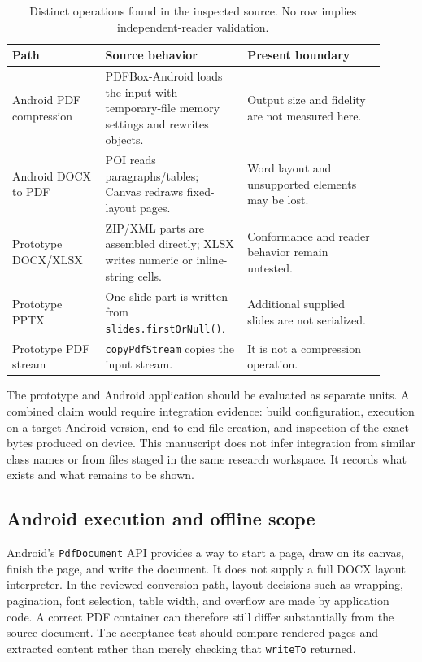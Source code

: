 \documentclass[10pt,letterpaper]{article}
\begin{document}
\begin{table}[H]
\centering\small
\caption{Distinct operations found in the inspected source. No row implies independent-reader validation.}
\label{tab:doc-audit}
\begin{tabular}{@{}>{\raggedright\arraybackslash}p{0.23\linewidth}>{\raggedright\arraybackslash}p{0.34\linewidth}>{\raggedright\arraybackslash}p{0.34\linewidth}@{}}
\toprule
Path & Source behavior & Present boundary \\
\midrule
Android PDF compression & PDFBox-Android loads the input with temporary-file memory settings and rewrites objects. & Output size and fidelity are not measured here. \\
Android DOCX to PDF & POI reads paragraphs/tables; Canvas redraws fixed-layout pages. & Word layout and unsupported elements may be lost. \\
Prototype DOCX/XLSX & ZIP/XML parts are assembled directly; XLSX writes numeric or inline-string cells. & Conformance and reader behavior remain untested. \\
Prototype PPTX & One slide part is written from \texttt{slides.firstOrNull()}. & Additional supplied slides are not serialized. \\
Prototype PDF stream & \texttt{copyPdfStream} copies the input stream. & It is not a compression operation. \\
\bottomrule
\end{tabular}
\end{table}


The prototype and Android application should be evaluated as separate units. A combined claim would require integration evidence: build configuration, execution on a target Android version, end-to-end file creation, and inspection of the exact bytes produced on device. This manuscript does not infer integration from similar class names or from files staged in the same research workspace. It records what exists and what remains to be shown.

\subsection{Android execution and offline scope}

Android's \texttt{PdfDocument} API \cite{r1} provides a way to start a page, draw on its canvas, finish the page, and write the document. It does not supply a full DOCX layout interpreter. In the reviewed conversion path, layout decisions such as wrapping, pagination, font selection, table width, and overflow are made by application code. A correct PDF container can therefore still differ substantially from the source document. The acceptance test should compare rendered pages and extracted content rather than merely checking that \texttt{writeTo} returned.
\end{document}
